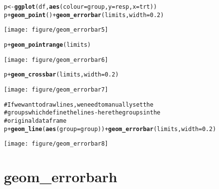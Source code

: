 \documentclass[a4paper,titlepage]{tufte-handout}\usepackage{graphicx, color}
\makeatletter
\def\maxwidth{ %
  \ifdim\Gin@nat@width>\linewidth
    \linewidth
  \else
    \Gin@nat@width
  \fi
}
\newcommand{\hlfunctioncall}[1]{\textcolor[rgb]{0.501960784313725,0,0.329411764705882}{\textbf{#1}}}%
\newcommand{\hlcomment}[1]{\textcolor[rgb]{0.180392156862745,0.6,0.341176470588235}{#1}}%
\newenvironment{kframe}{%
 \def\at@end@of@kframe{}%
 \ifinner\ifhmode%
  \def\at@end@of@kframe{\end{minipage}}%
  \begin{minipage}{\columnwidth}%
 \fi\fi%
 \def\FrameCommand##1{\hskip\@totalleftmargin \hskip-\fboxsep
 \colorbox{shadecolor}{##1}\hskip-\fboxsep
     \hskip-\linewidth \hskip-\@totalleftmargin \hskip\columnwidth}%
 \MakeFramed {\advance\hsize-\width
   \@totalleftmargin\z@ \linewidth\hsize
   \@setminipage}}%
 {\par\unskip\endMakeFramed%
 \at@end@of@kframe}
\newenvironment{knitrout}{}{} %
\makeatother
\begin{document}
\begin{knitrout}
\begin{kframe}
\begin{alltt}
p <- \hlfunctioncall{ggplot}(df, \hlfunctioncall{aes}(colour=group, y=resp, x=trt))
p + \hlfunctioncall{geom_point}() + \hlfunctioncall{geom_errorbar}(limits, width=0.2)
\end{alltt}
\end{kframe}\texttt{[image: figure/geom\_errorbar5]} \begin{kframe}\begin{alltt}
p + \hlfunctioncall{geom_pointrange}(limits)
\end{alltt}
\end{kframe}\texttt{[image: figure/geom\_errorbar6]} \begin{kframe}\begin{alltt}
p + \hlfunctioncall{geom_crossbar}(limits, width=0.2)
\end{alltt}
\end{kframe}\texttt{[image: figure/geom\_errorbar7]} \begin{kframe}\begin{alltt}
\hlcomment{# If we want to draw lines, we need to manually set the}
\hlcomment{# groups which define the lines - here the groups in the}
\hlcomment{# original dataframe}
p + \hlfunctioncall{geom_line}(\hlfunctioncall{aes}(group=group)) + \hlfunctioncall{geom_errorbar}(limits, width=0.2)
\end{alltt}
\end{kframe}\texttt{[image: figure/geom\_errorbar8]} 
\end{knitrout}


\section{geom\_errorbarh}
\end{document}
